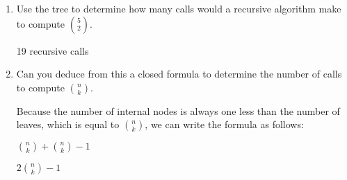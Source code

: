 \documentclass[12pt]{article}
\begin{document}
\begin{enumerate}
\item Use the tree to determine how many calls would a recursive algorithm
make to compute $\binom{5}{2}$.

19 recursive calls
\vspace*{0.25in}
\item Can you deduce from this a closed formula to determine the number of
calls to compute $\binom{n}{k}$.

Because the number of internal nodes is always one less than the number of leaves,
which is equal to $\binom{n}{k}$, we can write the formula as follows:

\begin{center}
    $\binom{n}{k} + \binom{n}{k} - 1$
    
    $2 \binom{n}{k} - 1$
\end{center}
\end{enumerate}
\end{document}
